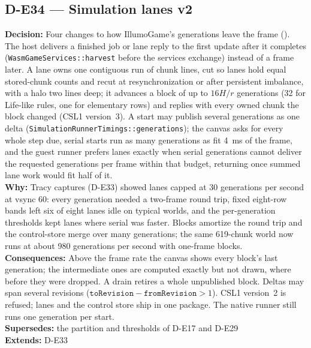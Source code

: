 \subsection*{D-E34 --- Simulation lanes v2}
\begin{decisionbox}[title={D-E34 \quad 2026-09-28}]
\textbf{Decision:} Four changes to how IllumoGame's generations leave the
frame (). The host delivers a
finished job or lane reply to the first update after it completes
(\texttt{WasmGameServices::harvest} before the services exchange) instead of
a frame later. A lane owns one contiguous run of chunk lines, cut so lanes
hold equal stored-chunk counts and recut at resynchronization or after
persistent imbalance, with a halo two lines deep; it advances a block of up
to $16H/r$ generations (32 for Life-like rules, one for elementary rows) and
replies with every owned chunk the block changed (CSL1 version~3). A start
may publish several generations as one delta
(\texttt{SimulationRunnerTimings::generations}); the canvas asks for every
whole step due, serial starts run as many generations as fit 4~ms of the
frame, and the guest runner prefers lanes exactly when serial generations
cannot deliver the requested generations per frame within that budget,
returning once summed lane work would fit half of it.\\
\textbf{Why:} Tracy captures (D-E33) showed lanes capped at 30 generations per
second at vsync 60: every generation needed a two-frame round trip, fixed
eight-row bands left six of eight lanes idle on typical worlds, and the
per-generation thresholds kept lanes where serial was faster. Blocks
amortize the round trip and the control-store merge over many generations;
the same 619-chunk world now runs at about 980 generations per second with
one-frame blocks.\\
\textbf{Consequences:} Above the frame rate the canvas shows every block's
last generation; the intermediate ones are computed exactly but not drawn,
where before they were dropped. A drain retires a whole unpublished block.
Deltas may span several revisions ($\texttt{toRevision} -
\texttt{fromRevision} > 1$). CSL1 version~2 is refused; lanes and the
control store ship in one package. The native runner still runs one
generation per start.\\
\textbf{Supersedes:} the partition and thresholds of D-E17 and D-E29\\
\textbf{Extends:} D-E33
\end{decisionbox}

